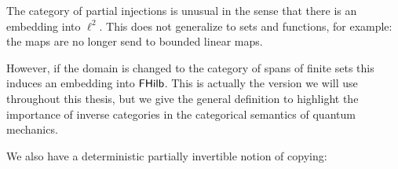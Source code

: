 

The category of partial injections is unusual in the sense that there is an embedding into $\ell^2$. This does not generalize to sets and functions, for example: the maps are no longer send to bounded linear maps.

However, if the domain is changed to the category of spans of finite sets this induces an embedding into $\mathsf{FHilb}$.  This is actually the version we will use throughout this thesis, but we give the general definition to highlight the importance of inverse categories in the categorical semantics of quantum mechanics.


We also have a deterministic partially invertible notion of copying:



